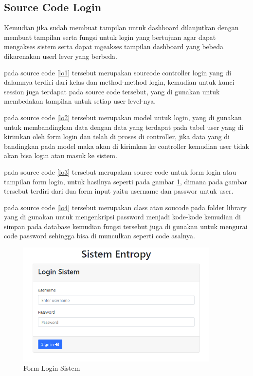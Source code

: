 \subsection{Source Code Login}
	Kemudian jika sudah membuat tampilan untuk dashboard dilanjutkan dengan membuat tampilan serta fungsi untuk login yang bertujuan agar dapat mengakses sistem serta dapat mgeakses tampilan dashboard yang bebeda dikarenakan userl lever yang berbeda.

pada source code \ref{lo1} tersebut merupakan sourcode controller login yang di dalamnya terdiri dari kelas dan method-method login, kemudian untuk kunci session juga terdapat pada source code tersebut, yang di gunakan untuk membedakan tampilan untuk setiap user level-nya.

pada source code \ref{lo2} tersebut merupakan model untuk login, yang di gunakan untuk membandingkan data dengan data yang terdapat pada tabel user yang di kirimkan oleh form login dan telah di proses di controller, jika data yang di bandingkan pada model maka akan di kirimkan ke controller kemudian user tidak akan bisa login atau masuk ke sistem.

pada source code \ref{lo3} tersebut merupakan source code untuk form login atau tampilan form login, untuk hasilnya seperti pada gambar \ref{ve7}, dimana pada gambar tersebut terdiri dari dua form input yaitu username dan passwor untuk user.
\pagebreak

pada source code \ref{lo4} tersebut merupakan class atau soucode pada folder library yang di gunakan untuk mengenkripsi password menjadi kode-kode kemudian di simpan pada database kemudian fungsi tersebut juga di gunakan untuk mengurai code password sehingga bisa di munculkan seperti code asalnya.

\begin{figure}[!htbp]
	\centerline{\includegraphics[width=0.90\textwidth]{figures/view/7.png}}
	\caption{Form Login Sistem}
	\label{ve7}
\end{figure}

